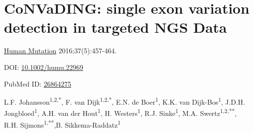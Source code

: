 \chapter[CoNVaDING: single exon variation detection in NGS data]{CoNVaDING: single exon variation detection in targeted NGS Data}
\label{chap:CoNVaDING}

{ \Large {} }

\hfill \underline{Human Mutation} 2016;37(5):457-464.

\hfill DOI: \href{https://doi.org/10.1002/humu.22969}{10.1002/humu.22969}

\hfill PubMed ID: \href{https://www.ncbi.nlm.nih.gov/pubmed/26864275}{26864275}

\newpage

\noindent
L.F. Johansson\textsuperscript{1,2,*}, F. van Dijk\textsuperscript{1,2,*}, E.N. de Boer\textsuperscript{1}, K.K. van Dijk-Bos\textsuperscript{1}, J.D.H. Jongbloed\textsuperscript{1}, A.H. van der Hout\textsuperscript{1}, H. Westers\textsuperscript{1}, R.J. Sinke\textsuperscript{1}, M.A. Swertz\textsuperscript{1,2,**}, R.H. Sijmons\textsuperscript{1,**},B. Sikkema-Raddatz\textsuperscript{1}  \\

